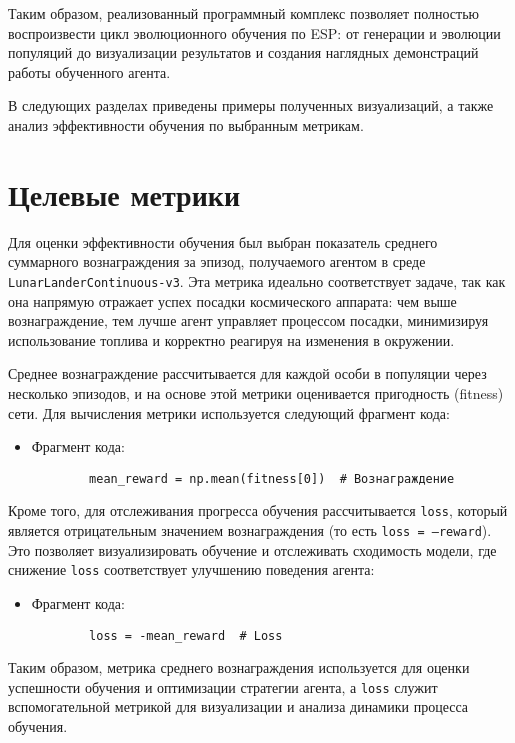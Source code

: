 \documentclass[a4paper,12pt]{article}
\begin{document}
Таким образом, реализованный программный комплекс позволяет полностью воспроизвести цикл эволюционного обучения по ESP: от генерации и эволюции популяций до визуализации результатов и создания наглядных демонстраций работы обученного агента.

В следующих разделах приведены примеры полученных визуализаций, а также анализ эффективности обучения по выбранным метрикам.

\section{Целевые метрики}

Для оценки эффективности обучения был выбран показатель среднего суммарного вознаграждения за эпизод, получаемого агентом в среде \texttt{LunarLanderContinuous-v3}. Эта метрика идеально соответствует задаче, так как она напрямую отражает успех посадки космического аппарата: чем выше вознаграждение, тем лучше агент управляет процессом посадки, минимизируя использование топлива и корректно реагируя на изменения в окружении.

Среднее вознаграждение рассчитывается для каждой особи в популяции через несколько эпизодов, и на основе этой метрики оценивается пригодность (fitness) сети. Для вычисления метрики используется следующий фрагмент кода:

\begin{itemize}
	\item[] Фрагмент кода:
	\begin{lstlisting}
		mean_reward = np.mean(fitness[0])  # Вознаграждение
	\end{lstlisting}
\end{itemize}

Кроме того, для отслеживания прогресса обучения рассчитывается \texttt{loss}, который является отрицательным значением вознаграждения (то есть \texttt{loss = –reward}). Это позволяет визуализировать обучение и отслеживать сходимость модели, где снижение \texttt{loss} соответствует улучшению поведения агента:

\begin{itemize}
	\item[] Фрагмент кода:
	\begin{lstlisting}
		loss = -mean_reward  # Loss
	\end{lstlisting}
\end{itemize}

Таким образом, метрика среднего вознаграждения используется для оценки успешности обучения и оптимизации стратегии агента, а \texttt{loss} служит вспомогательной метрикой для визуализации и анализа динамики процесса обучения.
\end{document}
